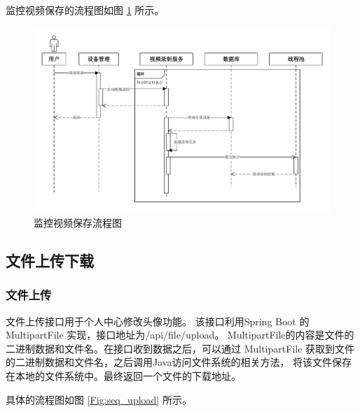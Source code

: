 监控视频保存的流程图如图 \ref{Fig:video_save} 所示。

\begin{figure}[ht]
    \centering
    \includegraphics[width=1\linewidth]{./Figure/IMG_video_save.pdf}
    \caption{监控视频保存流程图}\label{Fig:video_save}
\end{figure}

\subsection{文件上传下载}
\subsubsection{文件上传}
文件上传接口用于个人中心修改头像功能。
该接口利用Spring Boot 的 MultipartFile 实现，接口地址为/api/file/upload。
MultipartFile的内容是文件的二进制数据和文件名。在接口收到数据之后，可以通过 
MultipartFile 获取到文件的二进制数据和文件名，之后调用Java访问文件系统的相关方法，
将该文件保存在本地的文件系统中。最终返回一个文件的下载地址。


具体的流程图如图 \ref{Fig:seq_upload} 所示。

